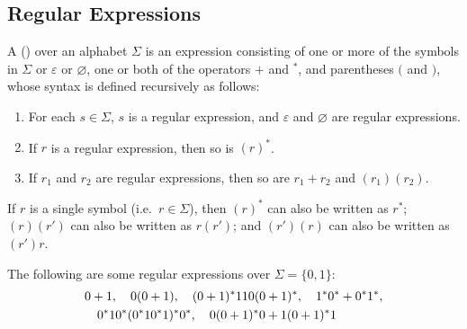 \begin{Example}
\begin{center}
\end{center}
\end{Example}

\subsection{Regular Expressions}\label{subsec:RE}

A  () over an alphabet $\Sigma$ is an expression consisting of one or more of the symbols in $\Sigma$ or $\varepsilon$ or $\varnothing$, one or both of the operators $+$ and ${}^*$, and parentheses $($ and $)$, whose syntax is defined recursively as follows:
\begin{enumerate}
\item For each $s \in \Sigma$, $s$ is a regular expression, and $\varepsilon$ and $\varnothing$ are regular expressions.
\item If $r$ is a regular expression, then so is $(r)^*$.
\item If $r_1$ and $r_2$ are regular expressions, then so are $r_1 + r_2$ and $(r_1)(r_2)$.
\end{enumerate}

\begin{Note*}
If $r$ is a single symbol (i.e.\ $r \in \Sigma$), then $(r)^*$ can also be written as $r^*$; $(r)(r')$ can also be written as $r(r')$; and $(r')(r)$ can also be written as $(r')r$.
\end{Note*}

\begin{Example}
The following are some regular expressions over $\Sigma = \{0, 1\}$:
\begin{align*}
& 0 + 1, \quad 0(0 + 1), \quad (0 + 1)^*110(0 + 1)^*, \quad 1^* 0^* + 0^* 1^*, \\& \quad 0^* 1 0^*(0^* 1 0^* 1)^* 0^*, \quad 0 (0 + 1)^* 0 + 1 (0 + 1)^* 1
\end{align*}
\end{Example}

